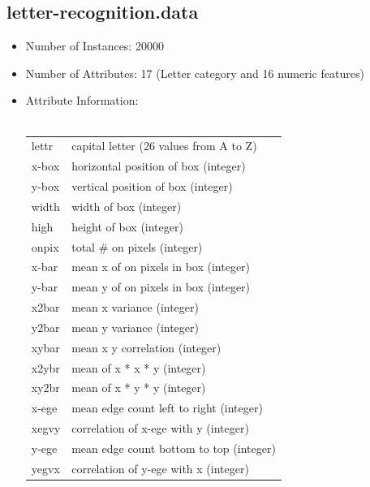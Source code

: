 \documentclass[10pt]{report}
\begin{document}
\subsection*{letter-recognition.data}
\begin{itemize}
\item Number of Instances: 20000
\item Number of Attributes: 17 (Letter category and 16 numeric features)
\item Attribute Information:
  \\\\
  \begin{left}
    \begin{tabular}{ l p{10cm} }
      lettr	   &    capital letter	(26 values from A to Z) \\
      x-box	   &    horizontal position of box	(integer) \\
      y-box	   &    vertical position of box	(integer) \\
      width	   &    width of box			(integer) \\
      high 	   &    height of box			(integer) \\
      onpix	   &    total # on pixels		(integer) \\
      x-bar	   &    mean x of on pixels in box	(integer) \\
      y-bar	   &    mean y of on pixels in box	(integer) \\
      x2bar	   &    mean x variance			(integer) \\
      y2bar	   &    mean y variance			(integer) \\
      xybar	   &    mean x y correlation		(integer) \\
      x2ybr	   &    mean of x * x * y		(integer) \\
      xy2br	   &    mean of x * y * y		(integer) \\
      x-ege	   &    mean edge count left to right	(integer) \\
      xegvy	   &    correlation of x-ege with y	(integer) \\
      y-ege	   &    mean edge count bottom to top	(integer) \\
      yegvx	   &    correlation of y-ege with x	(integer) \\
    \end{tabular}
  \end{left}


\end{itemize}
\end{document}
